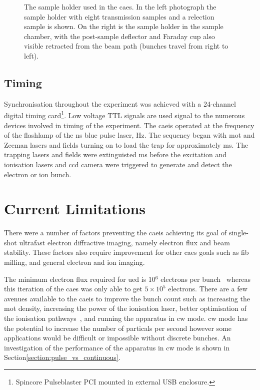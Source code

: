 \begin{figure}
\begin{subfigure}{0.49\linewidth}
    \end{subfigure}
    \caption{The sample holder used in the \gls{caes}. In the left photograph the sample holder with eight transmission samples and a relection sample is shown. On the right is the sample holder in the sample chamber, with the post-sample deflector and Faraday cup also visible retracted from the beam path (bunches travel from right to left).}
    \label{figure:sample_holder}
\end{figure}

\subsection{Timing}\label{section:pulse_blaster}

Synchronisation throughout the experiment was achieved with a 24-channel digital timing card\footnote{Spincore Pulseblaster PCI mounted in external USB enclosure.}.
Low voltage TTL signals are used signal to the numerous devices involved in timing of the experiment.
The \gls{caeis} operated at the frequency of the flashlamp of the \unit[5]{ns} blue pulse laser, \unit[10]{Hz}.
The sequency began with \gls{mot} and Zeeman lasers and fields turning on to load the trap for approximately \unit[90]{ms}.
The trapping lasers and fields were extinguisted \unit[5]{ms} before the excitation and ionisation lasers and \gls{ccd} camera were triggered to generate and detect the electron or ion bunch.

\section{Current Limitations}

There were a number of factors preventing the \gls{caeis} achieving its goal of single-shot ultrafast electron diffractive imaging, namely electron flux and beam stability.
These factors also require improvement for other \gls{caes} goals such as \gls{fib} milling, and general electron and ion imaging.

The minimum electron flux required for \gls{ued} is 10$^6$ electrons per bunch~\cite{van_oudheusden_compression_2010} whereas this iteration of the \gls{caes} was only able to get $5\times10^5$ electrons.
There are a few avenues available to the \gls{caeis} to improve the bunch count such as increasing the \gls{mot} density, increasing the power of the ionisation laser, better optimisation of the ionisation pathways~\cite{mcculloch_field_2017}, and running the apparatus in \gls{cw} mode.
\Gls{cw} mode  has the potential to increase the number of particals per second however some applications would be difficult or impossible without discrete bunches.
An investigation of the performance of the apparatus in \gls{cw} mode is shown in Section\ref{section:pulse_vs_continuous}.

